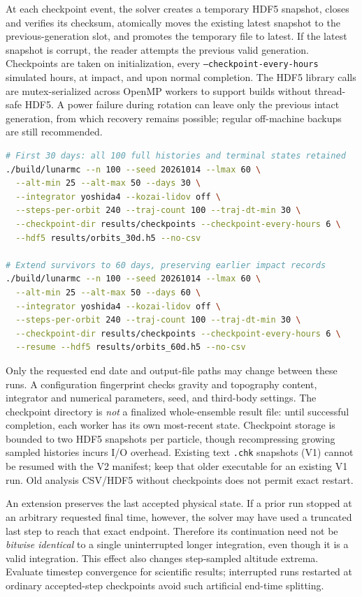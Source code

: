 \documentclass[11pt,a4paper]{article}
\newcommand{\opt}[1]{\texttt{#1}}
\newcommand{\pathcode}[1]{\nolinkurl{#1}}
\begin{document}
At each checkpoint event, the solver creates a temporary HDF5 snapshot,
closes and verifies its checksum, atomically moves the existing latest
snapshot to the previous-generation slot, and promotes the temporary file to
latest. If the latest snapshot is corrupt, the reader attempts the previous
valid generation. Checkpoints are taken on initialization, every
\opt{--checkpoint-every-hours} simulated hours, at impact, and upon normal
completion. The HDF5 library calls are mutex-serialized across OpenMP workers
to support builds without thread-safe HDF5. A power failure during rotation
can leave only the previous intact generation, from which recovery remains
possible; regular off-machine backups are still recommended.

\begin{lstlisting}[language=bash]
# First 30 days: all 100 full histories and terminal states retained
./build/lunarmc --n 100 --seed 20261014 --lmax 60 \
  --alt-min 25 --alt-max 50 --days 30 \
  --integrator yoshida4 --kozai-lidov off \
  --steps-per-orbit 240 --traj-count 100 --traj-dt-min 30 \
  --checkpoint-dir results/checkpoints --checkpoint-every-hours 6 \
  --hdf5 results/orbits_30d.h5 --no-csv

# Extend survivors to 60 days, preserving earlier impact records
./build/lunarmc --n 100 --seed 20261014 --lmax 60 \
  --alt-min 25 --alt-max 50 --days 60 \
  --integrator yoshida4 --kozai-lidov off \
  --steps-per-orbit 240 --traj-count 100 --traj-dt-min 30 \
  --checkpoint-dir results/checkpoints --checkpoint-every-hours 6 \
  --resume --hdf5 results/orbits_60d.h5 --no-csv
\end{lstlisting}
Only the requested end date and output-file paths may change between these
runs. A configuration fingerprint checks gravity and topography content,
integrator and numerical parameters, seed, and third-body settings. The
checkpoint directory is \emph{not} a finalized whole-ensemble result file:
until successful completion, each worker has its own most-recent state.
Checkpoint storage is bounded to two HDF5 snapshots per particle, though
recompressing growing sampled histories incurs I/O overhead. Existing text
\pathcode{.chk} snapshots (V1) cannot be resumed with the V2 manifest; keep
that older executable for an existing V1 run. Old analysis CSV/HDF5 without
checkpoints does not permit exact restart.


\begin{note}
An extension preserves the last accepted physical state. If a prior run
stopped at an arbitrary requested final time, however, the solver may have
used a truncated last step to reach that exact endpoint. Therefore its
continuation need not be \emph{bitwise identical} to a single uninterrupted
longer integration, even though it is a valid integration. This effect also
changes step-sampled altitude extrema. Evaluate timestep convergence for
scientific results; interrupted runs restarted at ordinary accepted-step
checkpoints avoid such artificial end-time splitting.
\end{note}
\end{document}
